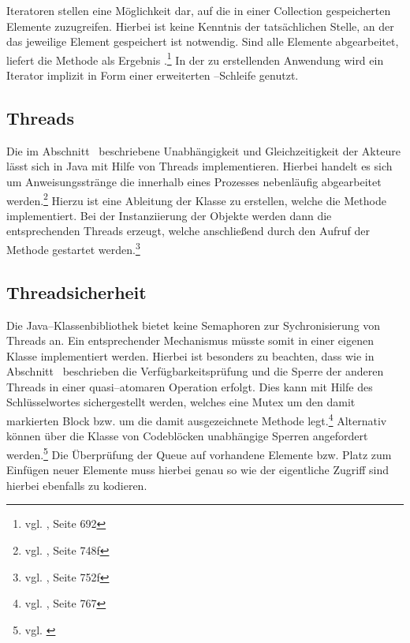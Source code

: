 Iteratoren stellen eine Möglichkeit dar, auf die in einer Collection gespeicherten Elemente zuzugreifen. Hierbei ist keine Kenntnis der tatsächlichen Stelle, an der das jeweilige Element gespeichert ist notwendig. Sind alle Elemente abgearbeitet, liefert die Methode  als Ergebnis .\footnote{vgl. \cite{javaorange}, Seite 692} In der zu erstellenden Anwendung wird ein Iterator implizit in Form einer erweiterten –Schleife genutzt.

\subsection{Threads} %
\label{sub:die_klasse_thread}
Die im Abschnitt~ beschriebene Unabhängigkeit und Gleichzeitigkeit der Akteure lässt sich in Java mit Hilfe von Threads implementieren. Hierbei handelt es sich um Anweisungsstränge die innerhalb eines Prozesses nebenläufig abgearbeitet werden.\footnote{vgl. \cite{javaorange}, Seite 748f}
Hierzu ist eine Ableitung der Klasse  zu erstellen, welche die Methode  implementiert. Bei der Instanziierung der Objekte werden dann die entsprechenden Threads erzeugt, welche anschließend durch den Aufruf der Methode  gestartet werden.\footnote{vgl. \cite{javaorange}, Seite 752f}


\subsection{Threadsicherheit} %
\label{sub:realisierung_mit_linkedblockingqueue}
Die Java–Klassenbibliothek bietet keine Semaphoren zur Sychronisierung von Threads an. Ein entsprechender Mechanismus müsste somit in einer eigenen Klasse implementiert werden. Hierbei ist besonders zu beachten, dass wie in Abschnitt~ beschrieben die Verfügbarkeitsprüfung und die Sperre der anderen Threads in einer quasi–atomaren Operation erfolgt. Dies kann mit Hilfe des Schlüsselwortes  sichergestellt werden, welches eine \ac{Mutex} um den damit markierten Block bzw. um die damit ausgezeichnete Methode legt.\footnote{vgl. \cite{javaorange}, Seite 767} Alternativ können über die Klasse  von Codeblöcken unabhängige Sperren angefordert werden.\footnote{vgl. \cite{javadoc:rl}} Die Überprüfung der Queue auf vorhandene Elemente bzw. Platz zum Einfügen neuer Elemente muss hierbei genau so wie der eigentliche Zugriff sind hierbei ebenfalls zu kodieren.

